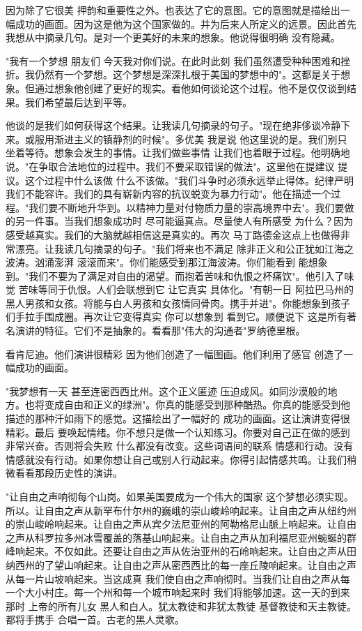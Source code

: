 因为除了它很美 押韵和重要性之外。也表达了它的意图。它的意图就是描绘出一幅成功的画面。因为这是他为这个国家做的。并为后来人所定义的远景。因此首先 我想从中摘录几句。是对一个更美好的未来的想象。他说得很明确 没有隐藏。 

"我有一个梦想 朋友们 今天我对你们说。在此时此刻 我们虽然遭受种种困难和挫折。我仍然有一个梦想。这个梦想是深深扎根于美国的梦想中的"。这都是关于想象。但通过想象他创建了更好的现实。看他如何谈论这个过程。他不是仅仅谈到结果。我们希望最后达到平等。 

他谈的是我们如何获得这个结果。让我读几句摘录的句子。"现在绝非侈谈冷静下来。或服用渐进主义的镇静剂的时候"。多优美 我是说 他这里说的是。我们别只坐着等待。想象会发生的事情。让我们做些事情 让我们也着眼于过程。他明确地说。"在争取合法地位的过程中。我们不要采取错误的做法"。这里他在提建议 提议。这个过程中什么该做 什么不该做。"我们斗争时必须永远举止得体。纪律严明 我们不能容许。我们的具有崭新内容的抗议蜕变为暴力行动"。他在描述一个过程。"我们要不断地升华到。以精神力量对付物质力量的崇高境界中去"。我们要做的另一件事。当我们想象成功时 尽可能逼真点。尽量使人有所感受 为什么？因为感受越真实。我们的大脑就越相信这是真实的。再次 马丁路德金这点上也做得非常漂亮。让我读几句摘录的句子。"我们将来也不满足 除非正义和公正犹如江海之波涛。汹涌澎湃 滚滚而来"。你们能感受到那江海波涛。你们能看到 能想象到。"我们不要为了满足对自由的渴望。而抱着苦味和仇恨之杯痛饮"。他引入了味觉 苦味等同于仇恨。人们会联想到它 让它真实 具体化。"有朝一日 阿拉巴马州的黑人男孩和女孩。将能与白人男孩和女孩情同骨肉。携手并进"。你能想象到孩子们手拉手围成圈。再次让它变得真实 你可以想象到 看到它。顺便说下 这是所有著名演讲的特征。它们不是抽象的。看看那"伟大的沟通者"罗纳德里根。 

看肯尼迪。他们演讲很精彩 因为他们创造了一幅图画。他们利用了感官 创造了一幅成功的画面。 

"我梦想有一天 甚至连密西西比州。这个正义匿迹 压迫成风。如同沙漠般的地方。也将变成自由和正义的绿洲"。你真的能感受到那种酷热。你真的能感受到他描述的那种汗如雨下的感觉。这描绘出了一幅好的 成功的画面。这让演讲变得很精彩。最后 要唤起情绪。你不想只是做一个认知练习。你要对自己正在做的感到非常兴奋。否则将会失败 什么都没有改变。这些词语间的联系 情感和行动。没有情感就没有行动。如果你想让自己或别人行动起来。你得引起情感共鸣。让我们稍微看看那段历史性的演讲。 

"让自由之声响彻每个山岗。如果美国要成为一个伟大的国家 这个梦想必须实现。所以。让自由之声从新罕布什尔州的巍峨的崇山峻岭响起来。让自由之声从纽约州的崇山峻岭响起来。让自由之声从宾夕法尼亚州的阿勒格尼山脈上响起来。让自由之声从科罗拉多州冰雪覆盖的落基山响起来。让自由之声从加利福尼亚州蜿蜒的群峰响起来。不仅如此。还要让自由之声从佐治亚州的石岭响起来。让自由之声从田纳西州的了望山响起来。让自由之声从密西西比的每一座丘陵响起来。让自由之声从每一片山坡响起来。当这成真 我们使自由之声响彻时。当我们让自由之声从每一个大小村庄。每一个州和每一个城市响起来时 我们将能够加速。这一天的到来 那时 上帝的所有儿女 黑人和白人。犹太教徒和非犹太教徒 基督教徒和天主教徒。都将手携手 合唱一首。古老的黑人灵歌。 

